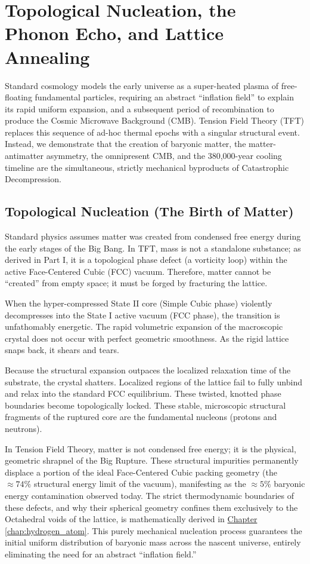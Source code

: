 \chapter{Topological Nucleation, the Phonon Echo, and Lattice Annealing}
\label{chap:nucleation_annealing}

Standard cosmology models the early universe as a super-heated plasma of free-floating fundamental particles, requiring an abstract ``inflation field'' to explain its rapid uniform expansion, and a subsequent period of recombination to produce the Cosmic Microwave Background (CMB). Tension Field Theory (TFT) replaces this sequence of ad-hoc thermal epochs with a singular structural event. Instead, we demonstrate that the creation of baryonic matter, the matter-antimatter asymmetry, the omnipresent CMB, and the 380,000-year cooling timeline are the simultaneous, strictly mechanical byproducts of Catastrophic Decompression.

\section{Topological Nucleation (The Birth of Matter)}
Standard physics assumes matter was created from condensed free energy during the early stages of the Big Bang. In TFT, mass is not a standalone substance; as derived in Part I, it is a topological phase defect (a vorticity loop) within the active Face-Centered Cubic (FCC) vacuum. Therefore, matter cannot be ``created'' from empty space; it must be forged by fracturing the lattice.

When the hyper-compressed State II core (Simple Cubic phase) violently decompresses into the State I active vacuum (FCC phase), the transition is unfathomably energetic. The rapid volumetric expansion of the macroscopic crystal does not occur with perfect geometric smoothness. As the rigid lattice snaps back, it shears and tears.

Because the structural expansion outpaces the localized relaxation time of the substrate, the crystal shatters. Localized regions of the lattice fail to fully unbind and relax into the standard FCC equilibrium. These twisted, knotted phase boundaries become topologically locked. These stable, microscopic structural fragments of the ruptured core are the fundamental nucleons (protons and neutrons).

In Tension Field Theory, matter is not condensed free energy; it is the physical, geometric shrapnel of the Big Rupture. These structural impurities permanently displace a portion of the ideal Face-Centered Cubic packing geometry (the $\approx 74\%$ structural energy limit of the vacuum), manifesting as the $\approx 5\%$ baryonic energy contamination observed today. The strict thermodynamic boundaries of these defects, and why their spherical geometry confines them exclusively to the Octahedral voids of the lattice, is mathematically derived in \hyperref[chap:hydrogen_atom]{Chapter \ref*{chap:hydrogen_atom}}. This purely mechanical nucleation process guarantees the initial uniform distribution of baryonic mass across the nascent universe, entirely eliminating the need for an abstract ``inflation field.''


